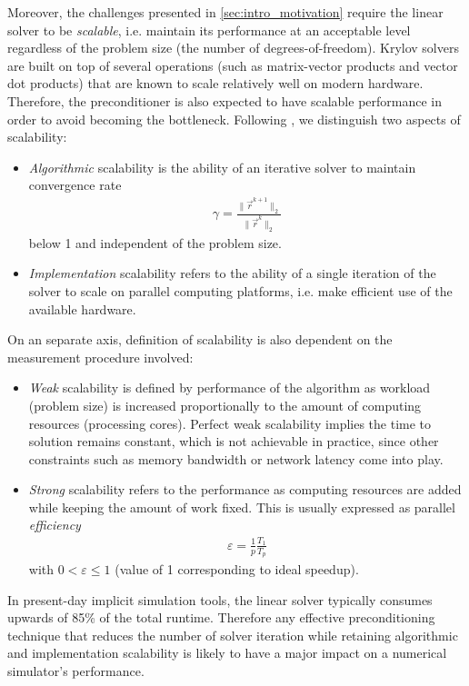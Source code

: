 Moreover, the challenges presented in \autoref{sec:intro_motivation} require the linear solver to be \textit{scalable}, i.e. maintain its performance at an acceptable level regardless of the problem size (the number of degrees-of-freedom).   Krylov solvers are built on top of several operations (such as matrix-vector products and vector dot products) that are known to scale relatively well on modern hardware.   Therefore, the preconditioner is also expected to have scalable performance in order to avoid becoming the bottleneck.   Following \cite{Manea2015}, we distinguish two aspects of scalability:
\begin{itemize}
    \item \textit{Algorithmic} scalability is the ability of an iterative solver to maintain convergence rate 
    \begin{align}
        \gamma = \frac{\|\vec{r}^{k+1}\|_2}{\|\vec{r}^k\|_2}
    \end{align}
    below 1 and independent of the problem size.
    \item \textit{Implementation} scalability refers to the ability of a single iteration of the solver to scale on parallel computing platforms, i.e. make efficient use of the available hardware.
\end{itemize}
On an separate axis, definition of scalability is also dependent on the measurement procedure involved:
\begin{itemize}
    \item \textit{Weak} scalability is defined by performance of the algorithm as workload (problem size) is increased proportionally to the amount of computing resources (processing cores).   Perfect weak scalability implies the time to solution remains constant, which is not achievable in practice, since other constraints such as memory bandwidth or network latency come into play.
    \item \textit{Strong} scalability refers to the performance as computing resources are added while keeping the amount of work fixed.   This is usually expressed as parallel \textit{efficiency}
    \begin{align}
        \varepsilon = \frac{1}{p}\frac{T_1}{T_p}
    \end{align}
    with $0 < \varepsilon \leq 1$ (value of 1 corresponding to ideal speedup).
\end{itemize}
In present-day implicit simulation tools, the linear solver typically consumes upwards of 85\% of the total runtime.   Therefore any effective preconditioning technique that reduces the number of solver iteration while retaining algorithmic and implementation scalability is likely to have a major impact on a numerical simulator's performance.

